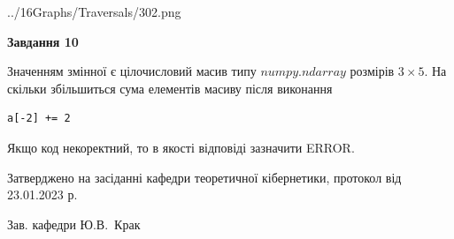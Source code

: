 \documentclass[12pt, ukrainian]{article}
\begin{document}
{\begin {large}
\begin{center}
	{../16Graphs/Traversals/302.png}
\end{center}\par
\newpage

{\begin {center}\textbf{Завдання 10}\end {center}}\par
Значенням змінної  є цілочисловий масив типу $numpy.ndarray$ розмірів $3{\times}5$. На скільки збільшиться сума елементів масиву  після виконання
\begin{verbatim}
a[-2] += 2
\end{verbatim}


Якщо код некоректний, то в якості відповіді зазначити ERROR.\par
\newpage


\end {large}
}
{\smallskip \begin {small} Затверджено на засіданні кафедри теоретичної кібернетики, протокол  від   23.01.2023 р.\par\smallskip\smallskip
{\parbox {6.5 cm}{Зав. кафедри \dotfill Ю.В.~Крак}} \end{small}}
\end{document}
